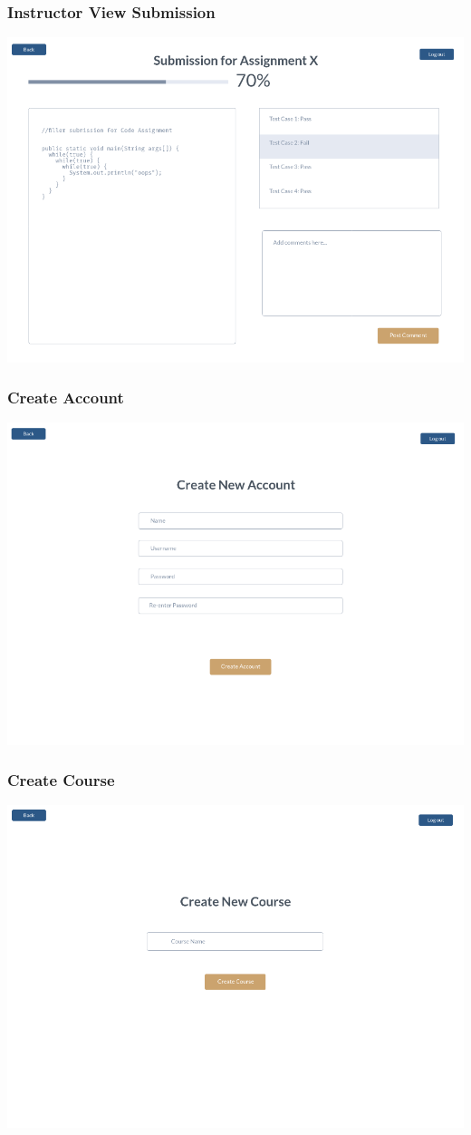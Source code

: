 \documentclass{article}
\begin{document}
\subsubsection{Instructor View Submission}
\includegraphics[width=0.8\linewidth]{InstructorViewSubmission.png}

\subsubsection{Create Account}
\includegraphics[width=0.8\linewidth]{CreateAccount.png}

\subsubsection{Create Course}
\includegraphics[width=0.8\linewidth]{CreateCourse.png}
\end{document}
